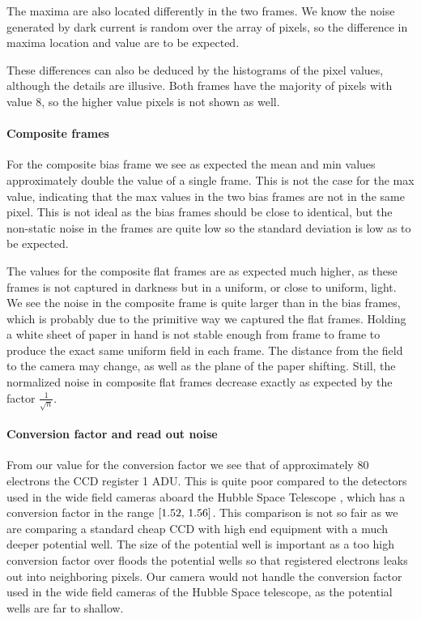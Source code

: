 \documentclass{emulateapj}
\begin{document}
The maxima are also located differently in the two frames. We know the noise generated by dark current is random over the array of pixels, so the difference in maxima location and value are to be expected.

These differences can also be deduced by the histograms of the pixel values, although the details are illusive. Both frames have the majority of pixels with value $8$, so the higher value pixels is not shown as well. 

\paragraph{Composite frames}
For the composite bias frame we see as expected the mean and min values approximately double the value of a single frame. This is not the case for the max value, indicating that the max values in the two bias frames are not in the same pixel. This is not ideal as the bias frames should be close to identical, but the non-static noise in the frames are quite low so the standard deviation is low as to be expected.

The values for the composite flat frames are as expected much higher, as these frames is not captured in darkness but in a uniform, or close to uniform, light. We see the noise in the composite frame is quite larger than in the bias frames, which is probably due to the primitive way we captured the flat frames. Holding a white sheet of paper in hand is not stable enough from frame to frame to produce the exact same uniform field in each frame.  The distance from the field to the camera may change, as well as the plane of the paper shifting. Still, the normalized noise in composite flat frames decrease exactly as expected by the factor $\frac{1}{\sqrt{n}}$.
\paragraph{Conversion factor and read out noise}
From our value for the conversion factor we see that of approximately $80$ electrons the CCD register 1 ADU. This is quite poor compared to the detectors used in the wide field cameras aboard the Hubble Space Telescope \citep{HSTdetectors}, which has a conversion factor in the range $\qty[1.52,\, 1.56]$. This comparison is not so fair as we are comparing a standard cheap CCD with high end equipment with a much deeper potential well. The size of the potential well is important as a too high conversion factor over floods the potential wells so that registered electrons leaks out into neighboring pixels. Our camera would not handle the conversion factor used in the wide field cameras of the Hubble Space telescope, as the potential wells are far to shallow.
\end{document}
